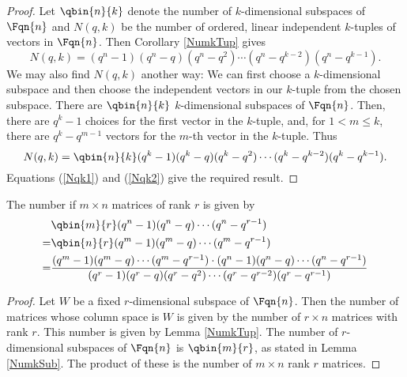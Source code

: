 \begin{proof}
  Let $\qbin{n}{k}$ denote the number of $k$-dimensional subspaces of $\Fqn{n}$ and $N(q,k)$ be the number of ordered, linear independent $k$-tuples of vectors in $\Fqn{n}$.  Then Corollary \ref{NumkTup} gives
\begin{equation}\label{Nqk1}
N(q,k) = (q^n-1)(q^n-q)(q^n-q^2)\cdots(q^n - q^{k-2})(q^n-q^{k-1}).
\end{equation}
We may also find $N(q,k)$ another way: We can first choose a $k$-dimensional subspace and then choose the independent vectors in our $k$-tuple from the chosen subspace.  There are $\qbin{n}{k}$ $k$-dimensional subspaces of $\Fqn{n}$.  Then, there are $q^k-1$ choices for the first vector in the $k$-tuple, and, for $1<m \leq k$, there are $q^k - q^{m-1}$ vectors for the $m$-th vector in the $k$-tuple.  Thus
\begin{equation}\label{Nqk2}
N(q,k) = \qbin{n}{k}(q^k-1)(q^k-q)(q^k-q^2)\cdots(q^k - q^{k-2})(q^k-q^{k-1}).
\end{equation}
Equations (\ref{Nqk1}) and (\ref{Nqk2}) give the required result.
\end{proof}

\begin{lemma}\label{Num_mbyn_rankr}
The number if $m\times n$ matrices of rank $r$ is given by
\begin{align*}
	&\qbin{m}{r}(q^n-1)(q^n-q)\cdots (q^n-q^{r-1})\\
   =& \qbin{n}{r}(q^m-1)(q^m-q)\cdots (q^m-q^{r-1})\\
   =& \frac{(q^m-1) (q^m-q) \cdots (q^m-q^{r-1})\cdot
            (q^n-1) (q^n-q) \cdots (q^n-q^{r-1})}
	 		      {(q^r-1)(q^r - q)(q^r - q^2)\cdots (q^r - q^{r-2})(q^r-q^{r-1})}
\end{align*}
\end{lemma}

\begin{proof}
  Let $W$ be a fixed $r$-dimensional subspace of $\Fqn{n}$.  Then the number of matrices whose column space is $W$ is given by the number of $r\times n$ matrices with rank $r$.  This number is given by Lemma \ref{NumkTup}. The number of $r$-dimensional subspaces of $\Fqn{n}$ is $\qbin{m}{r}$, as stated in Lemma \ref{NumkSub}.  The product of these is the number of $m\times n$ rank $r$ matrices.
\end{proof}
